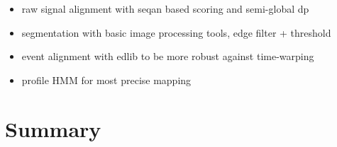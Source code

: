 \begin{itemize}
	\item raw signal alignment with seqan based scoring and semi-global dp
	\item segmentation with basic image processing tools, edge filter + threshold
	\item event alignment with edlib to be more robust against time-warping
	\item profile HMM for most precise mapping
\end{itemize}

\section{Summary}
\label{sec:signal:summary}



